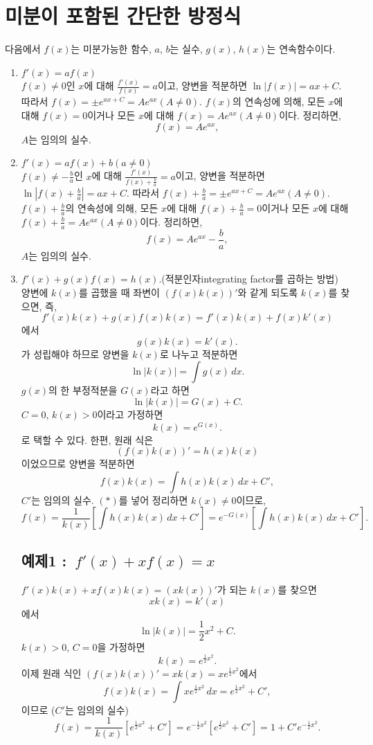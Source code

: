\documentclass{oblivoir}
\newcommand{\dx}{\ensuremath{\,dx}}
\begin{document}
\newpage
\section*{미분이 포함된 간단한 방정식}
다음에서 \(f(x)\)는 미분가능한 함수, \(a\), \(b\)는 실수, \(g(x)\), \(h(x)\)는 연속함수이다.
\begin{enumerate}[(1)]
\item
\(f'(x)=af(x)\)\\
\(f(x)\neq0\)인 \(x\)에 대해 \(\frac{f'(x)}{f(x)}=a\)이고, 양변을 적분하면
\(\ln\left|f(x)\right|=ax+C\).
따라서 \(f(x)=\pm e^{ax+C}=Ae^{ax}(A\neq0)\).
\(f(x)\)의 연속성에 의해, 모든 \(x\)에 대해 \(f(x)=0\)이거나 모든 \(x\)에 대해 \(f(x)=Ae^{ax}(A\neq0)\)이다.
정리하면,
\[f(x)=Ae^{ax},\]
\(A\)는 임의의 실수.
\item
\(f'(x)=af(x)+b(a\neq0)\)\\
\(f(x)\neq-\frac ba\)인 \(x\)에 대해 \(\frac{f'(x)}{f(x)+\frac ba}=a\)이고, 양변을 적분하면 \(\ln|f(x)+\frac ba|=ax+C\).
따라서 \(f(x)+\frac ba=\pm e^{ax+C}=Ae^{ax}(A\neq0)\).
\(f(x)+\frac ba\)의 연속성에 의해, 모든 \(x\)에 대해 \(f(x)+\frac ba=0\)이거나 모든 \(x\)에 대해 \(f(x)+\frac ba=Ae^{ax}(A\neq0)\)이다.
정리하면,
\[f(x)=Ae^{ax}-\frac ba,\]
\(A\)는 임의의 실수.
\item
\(f'(x)+g(x)f(x)=h(x)\).(적분인자integrating factor를 곱하는 방법)\\
양변에 \(k(x)\)를 곱했을 때 좌변이 \((f(x)k(x))'\)와 같게 되도록 \(k(x)\)를 찾으면, 즉,
\[f'(x)k(x)+g(x)f(x)k(x)=f'(x)k(x)+f(x)k'(x)\]
에서
\[g(x)k(x)=k'(x).\]
가 성립해야 하므로 양변을 \(k(x)\)로 나누고 적분하면
\[\ln|k(x)|=\int g(x)\dx.\]
\(g(x)\)의 한 부정적분을 \(G(x)\)라고 하면
\[\ln|k(x)|=G(x)+C.\]
\(C=0\), \(k(x)>0\)이라고 가정하면
\[k(x)=e^{G(x)}.\tag{\(\ast\)}\]
로 택할 수 있다.
한편, 원래 식은
\[(f(x)k(x))'=h(x)k(x)\]
이었으므로 양변을 적분하면
\[f(x)k(x)=\int h(x)k(x)\dx+C',\]
\(C'\)는 임의의 실수.
\((\ast)\)를 넣어 정리하면 \(k(x)\neq0\)이므로,
\[f(x)=\frac1{k(x)}\left[\int h(x)k(x)\dx+C'\right]=e^{-G(x)}\left[\int h(x)k(x)\dx+C'\right].\]

\subsection*{예제1 :~\(f'(x)+xf(x)=x\)}
\(f'(x)k(x)+xf(x)k(x)=(xk(x))'\)가 되는 \(k(x)\)를 찾으면
\[xk(x)=k'(x)\]
에서
\[\ln|k(x)|=\frac12x^2+C.\]
\(k(x)>0\), \(C=0\)을 가정하면
\[k(x)=e^{\frac12x^2}.\]
이제 원래 식인 \((f(x)k(x))'=xk(x)=xe^{\frac12x^2}\)에서
\[f(x)k(x)=\int xe^{\frac12x^2}\dx=e^{\frac12x^2}+C',\]
이므로 (\(C'\)는 임의의 실수)
\[f(x)=\frac1{k(x)}\left[e^{\frac12x^2}+C'\right]=e^{-\frac12x^2}\left[e^{\frac12x^2}+C'\right]=1+C'e^{-\frac12x^2}.\]
\end{enumerate}
\end{document}
